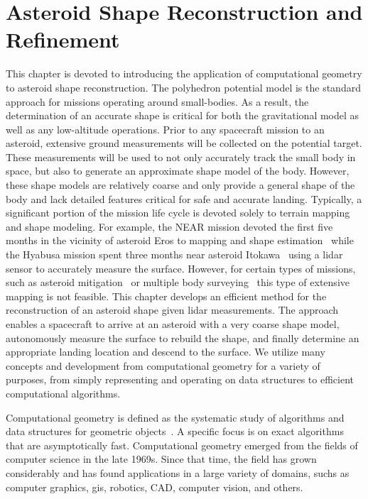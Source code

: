 
\chapter{Asteroid Shape Reconstruction and Refinement}\label{chap:shape_reconstruction}
This chapter is devoted to introducing the application of computational geometry to asteroid shape reconstruction.
The polyhedron potential model is the standard approach for missions operating around small-bodies.
As a result, the determination of an accurate shape is critical for both the gravitational model as well as any low-altitude operations.
Prior to any spacecraft mission to an asteroid, extensive ground measurements will be collected on the potential target.
These measurements will be used to not only accurately track the small body in space, but also to generate an approximate shape model of the body. 
However, these shape models are relatively coarse and only provide a general shape of the body and lack detailed features critical for safe and accurate landing.
Typically, a significant portion of the mission life cycle is devoted solely to terrain mapping and shape modeling.
For example, the NEAR mission devoted the first five months in the vicinity of asteroid Eros to mapping and shape estimation~\cite{antreasian2002} while the Hyabusa mission spent three months near asteroid Itokawa~\cite{barnouin-jha2008} using a \gls{lidar} sensor to accurately measure the surface.
However, for certain types of missions, such as asteroid mitigation~\cite{garshnek2000,pitz2014} or multiple body surveying~\cite{stuart2011a,stuart2016} this type of extensive mapping is not feasible.
This chapter develops an efficient method for the reconstruction of an asteroid shape given \gls{lidar} measurements.
The approach enables a spacecraft to arrive at an asteroid with a very coarse shape model, autonomously measure the surface to rebuild the shape, and finally determine an appropriate landing location and descend to the surface.
We utilize many concepts and development from computational geometry for a variety of purposes, from simply representing and operating on data structures to efficient computational algorithms.

Computational geometry is defined as the systematic study of algorithms and data structures for geometric objects~\cite{berg2008}.
A specific focus is on exact algorithms that are asymptotically fast.
Computational geometry emerged from the fields of computer science in the late 1969s.
Since that time, the field has grown considerably and has found applications in a large variety of domains, suchs as computer graphics, \gls{gis}, robotics, \gls{CAD}, computer vision, and others.

